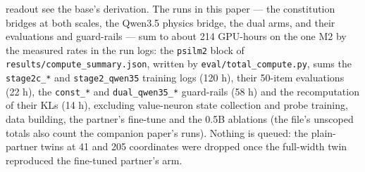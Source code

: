 \documentclass[11pt]{article}
\newcommand{\code}[1]{\texttt{#1}}
\begin{document}
readout see the base's derivation.
The runs in this paper --- the constitution bridges at both scales, the Qwen3.5
physics bridge, the dual arms, and their evaluations and guard-rails --- sum to
about 214 GPU-hours on the one M2 by the measured rates in the run logs: the
\code{psilm2} block of \code{results/compute\_summary.json}, written by
\code{eval/total\_compute.py}, sums the \code{stage2c\_*} and \code{stage2\_qwen35}
training logs (120 h), their 50-item evaluations (22 h), the \code{const\_*} and
\code{dual\_qwen35\_*} guard-rails (58 h) and the recomputation of their KLs (14 h), excluding value-neuron state collection
and probe training, data building, the partner's fine-tune and the 0.5B ablations
(the file's unscoped totals also count the companion paper's runs). Nothing is
queued: the plain-partner twins at 41 and 205 coordinates were dropped once the
full-width twin reproduced the fine-tuned partner's arm.
\end{document}
